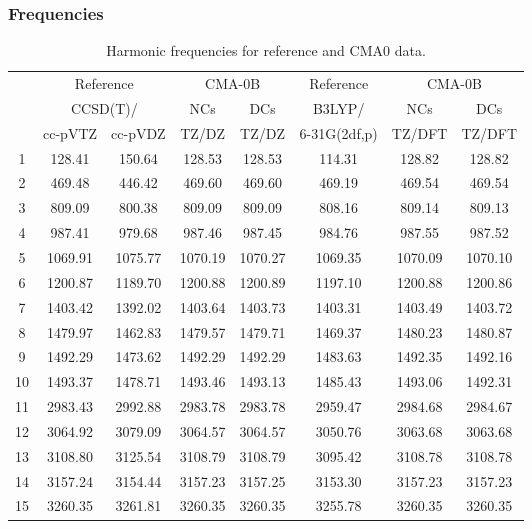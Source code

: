 \documentclass[10pt,oneside]{article}
\begin{document}
\clearpage

\subsubsection*{Frequencies}
\begin{table}[h!]
\centering
\caption{Harmonic frequencies for reference and CMA0 data.}
\begin{tabular}{cccccccc}
\toprule
{} & \multicolumn{2}{c}{Reference} & \multicolumn{2}{c}{CMA-0B} &    Reference & \multicolumn{2}{c}{CMA-0B} \\
{} & \multicolumn{2}{c}{CCSD(T)/} &     NCs &     DCs &       B3LYP/ &     NCs &     DCs \\
{} &   cc-pVTZ & cc-pVDZ &   TZ/DZ &   TZ/DZ & 6-31G(2df,p) &  TZ/DFT &  TZ/DFT \\
\midrule
1  &    128.41 &  150.64 &  128.53 &  128.53 &       114.31 &  128.82 &  128.82 \\
2  &    469.48 &  446.42 &  469.60 &  469.60 &       469.19 &  469.54 &  469.54 \\
3  &    809.09 &  800.38 &  809.09 &  809.09 &       808.16 &  809.14 &  809.13 \\
4  &    987.41 &  979.68 &  987.46 &  987.45 &       984.76 &  987.55 &  987.52 \\
5  &   1069.91 & 1075.77 & 1070.19 & 1070.27 &      1069.35 & 1070.09 & 1070.10 \\
6  &   1200.87 & 1189.70 & 1200.88 & 1200.89 &      1197.10 & 1200.88 & 1200.86 \\
7  &   1403.42 & 1392.02 & 1403.64 & 1403.73 &      1403.31 & 1403.49 & 1403.72 \\
8  &   1479.97 & 1462.83 & 1479.57 & 1479.71 &      1469.37 & 1480.23 & 1480.87 \\
9  &   1492.29 & 1473.62 & 1492.29 & 1492.29 &      1483.63 & 1492.35 & 1492.16 \\
10 &   1493.37 & 1478.71 & 1493.46 & 1493.13 &      1485.43 & 1493.06 & 1492.31 \\
11 &   2983.43 & 2992.88 & 2983.78 & 2983.78 &      2959.47 & 2984.68 & 2984.67 \\
12 &   3064.92 & 3079.09 & 3064.57 & 3064.57 &      3050.76 & 3063.68 & 3063.68 \\
13 &   3108.80 & 3125.54 & 3108.79 & 3108.79 &      3095.42 & 3108.78 & 3108.78 \\
14 &   3157.24 & 3154.44 & 3157.23 & 3157.25 &      3153.30 & 3157.23 & 3157.23 \\
15 &   3260.35 & 3261.81 & 3260.35 & 3260.35 &      3255.78 & 3260.35 & 3260.35 \\
\bottomrule
\end{tabular}
\end{table}
\end{document}
